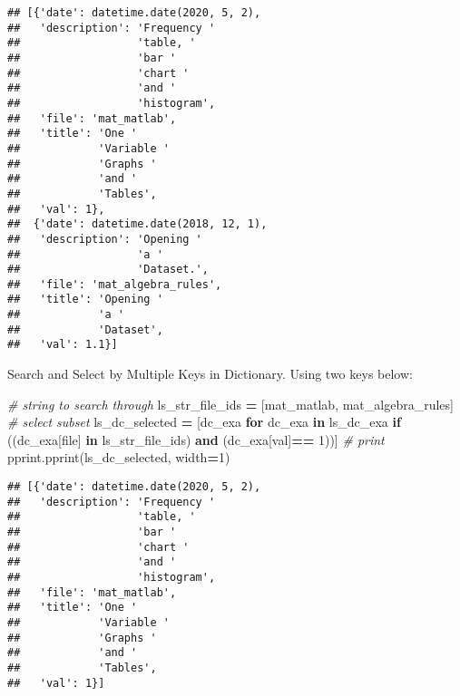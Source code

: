 \documentclass[
]{book}
\newenvironment{Shaded}{\begin{snugshade}}{\end{snugshade}}
\newcommand{\CommentTok}[1]{\textcolor[rgb]{0.56,0.35,0.01}{\textit{#1}}}
\newcommand{\ControlFlowTok}[1]{\textcolor[rgb]{0.13,0.29,0.53}{\textbf{#1}}}
\newcommand{\DecValTok}[1]{\textcolor[rgb]{0.00,0.00,0.81}{#1}}
\newcommand{\KeywordTok}[1]{\textcolor[rgb]{0.13,0.29,0.53}{\textbf{#1}}}
\newcommand{\NormalTok}[1]{#1}
\newcommand{\OperatorTok}[1]{\textcolor[rgb]{0.81,0.36,0.00}{\textbf{#1}}}
\newcommand{\StringTok}[1]{\textcolor[rgb]{0.31,0.60,0.02}{#1}}
\begin{document}
\begin{verbatim}
## [{'date': datetime.date(2020, 5, 2),
##   'description': 'Frequency '
##                  'table, '
##                  'bar '
##                  'chart '
##                  'and '
##                  'histogram',
##   'file': 'mat_matlab',
##   'title': 'One '
##            'Variable '
##            'Graphs '
##            'and '
##            'Tables',
##   'val': 1},
##  {'date': datetime.date(2018, 12, 1),
##   'description': 'Opening '
##                  'a '
##                  'Dataset.',
##   'file': 'mat_algebra_rules',
##   'title': 'Opening '
##            'a '
##            'Dataset',
##   'val': 1.1}]
\end{verbatim}

Search and Select by Multiple Keys in Dictionary. Using two keys below:

\begin{Shaded}
\begin{Highlighting}[]
\CommentTok{\# string to search through}
\NormalTok{ls\_str\_file\_ids }\OperatorTok{=}\NormalTok{ [}\StringTok{\textquotesingle{}mat\_matlab\textquotesingle{}}\NormalTok{, }\StringTok{\textquotesingle{}mat\_algebra\_rules\textquotesingle{}}\NormalTok{]}
\CommentTok{\# select subset}
\NormalTok{ls\_dc\_selected }\OperatorTok{=}\NormalTok{ [dc\_exa}
                  \ControlFlowTok{for}\NormalTok{ dc\_exa }\KeywordTok{in}\NormalTok{ ls\_dc\_exa}
                  \ControlFlowTok{if}\NormalTok{ ((dc\_exa[}\StringTok{\textquotesingle{}file\textquotesingle{}}\NormalTok{] }\KeywordTok{in}\NormalTok{ ls\_str\_file\_ids)}
                      \KeywordTok{and}
\NormalTok{                      (dc\_exa[}\StringTok{\textquotesingle{}val\textquotesingle{}}\NormalTok{]}\OperatorTok{==} \DecValTok{1}\NormalTok{))]}
\CommentTok{\# print}
\NormalTok{pprint.pprint(ls\_dc\_selected, width}\OperatorTok{=}\DecValTok{1}\NormalTok{)}
\end{Highlighting}
\end{Shaded}

\begin{verbatim}
## [{'date': datetime.date(2020, 5, 2),
##   'description': 'Frequency '
##                  'table, '
##                  'bar '
##                  'chart '
##                  'and '
##                  'histogram',
##   'file': 'mat_matlab',
##   'title': 'One '
##            'Variable '
##            'Graphs '
##            'and '
##            'Tables',
##   'val': 1}]
\end{verbatim}
\end{document}
